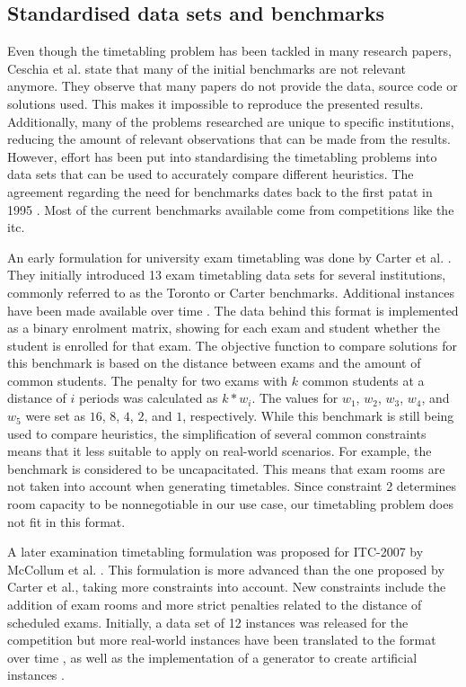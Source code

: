 \subsection{Standardised data sets and benchmarks}

Even though the timetabling problem has been tackled in many research papers, Ceschia et al.\cite{ceschia2022} state that many of the initial benchmarks are not relevant anymore. They observe that many papers do not provide the data, source code or solutions used. This makes it impossible to reproduce the presented results. Additionally, many of the problems researched are unique to specific institutions, reducing the amount of relevant observations that can be made from the results. However, effort has been put into standardising the timetabling problems into data sets that can be used to accurately compare different heuristics. The agreement regarding the need for benchmarks dates back to the first \acrfull{patat} in 1995 \cite{cumming1995}. Most of the current benchmarks available come from competitions like the \acrfull{itc}.

An early formulation for university exam timetabling was done by Carter et al. \cite{carter1996}. They initially introduced 13 exam timetabling data sets for several institutions, commonly referred to as the Toronto or Carter benchmarks. Additional instances have been made available over time \cite{bellio2021}. The data behind this format is implemented as a binary enrolment matrix, showing for each exam and student whether the student is enrolled for that exam. The objective function to compare solutions for this benchmark is based on the distance between exams and the amount of common students. The penalty for two exams with $k$ common students at a distance of $i$ periods was calculated as $k*w_{i}$. The values for $w_1$, $w_2$, $w_3$, $w_4$, and $w_5$ were set as $16$, $8$, $4$, $2$, and $1$, respectively. While this benchmark is still being used to compare heuristics, the simplification of several common constraints means that it less suitable to apply on real-world scenarios. For example, the benchmark is considered to be uncapacitated. This means that exam rooms are not taken into account when generating timetables. Since constraint 2 determines room capacity to be nonnegotiable in our use case, our timetabling problem does not fit in this format.

A later examination timetabling formulation was proposed for ITC-2007 by McCollum et al. \cite{mccollum2007}. This formulation is more advanced than the one proposed by Carter et al., taking more constraints into account. New constraints include the addition of exam rooms and more strict penalties related to the distance of scheduled exams. Initially, a data set of 12 instances was released for the competition but more real-world instances have been translated to the format over time \cite{parkes2010}, as well as the implementation of a generator to create artificial instances \cite{battistutta2017}.

